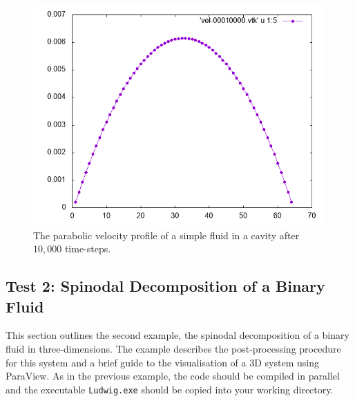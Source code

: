 \documentclass[11pt,twoside,a4paper]{article}
\begin{document}
\begin{figure}[h]
\begin{center}
\includegraphics[width=0.6\linewidth]{velProf.png}
  \caption{The parabolic velocity profile of a simple fluid in a cavity after $10,000$ time-steps.}
  \label{fig:velocityProfile}
  \end{center}
\end{figure}

\subsection{Test 2: Spinodal Decomposition of a Binary Fluid}

This section outlines the second example, the spinodal decomposition of a binary fluid in 
three-dimensions.
The example describes the post-processing procedure for this system and a brief guide to 
the visualisation of a 3D system using ParaView.
As in the previous example, the code should be compiled in parallel and the executable 
\texttt{Ludwig.exe} should be copied into your working directory.
\end{document}
